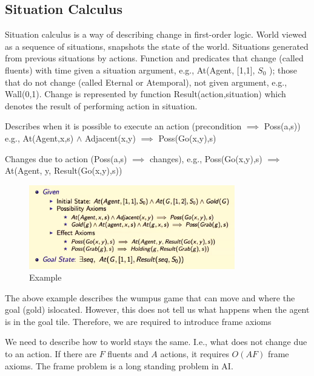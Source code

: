\documentclass[a4paper]{article}
\theoremstyle{plain}
\theoremstyle{definition}
\newtheorem{defn}{Definition}[section]
\theoremstyle{remark}
\begin{document}
\subsection{Situation Calculus}
Situation calculus is a way of describing change in first-order logic. World viewed as a sequence of situations, snapshots the state of the world. Situations generated from previous situations by actions. Function and predicates that change (called fluents) with time given a situation argument, e.g., At(Agent, [1,1], $S_0$ ); those that do not change (called Eternal or Atemporal), not given argument, e.g., Wall(0,1). Change is represented by function Result(action,situation) which denotes the result of performing action in situation.
\begin{tcolorbox}[colback=black!3!white,colframe=black!60!white,title=\begin{defn}Possibility Axioms \label{Possibility Axioms}\end{defn}]
Describes when it is possible to execute an action (precondition $\implies$ Poss(a,s)) e.g., At(Agent,x,s) $\land$ Adjacent(x,y) $\implies$ Poss(Go(x,y),s)
\end{tcolorbox}
\begin{tcolorbox}[colback=black!3!white,colframe=black!60!white,title=\begin{defn}Effect Axioms \label{Effect Axioms}\end{defn}]
Changes due to action (Poss(a,s) $\implies$ changes), e.g., Poss(Go(x,y),s) $\implies$ At(Agent, y, Result(Go(x,y),s))
\end{tcolorbox}
\begin{figure}[H]
	\centering
	\includegraphics[width=0.8\textwidth]{twelve.png}
	\caption{Example}
	\label{fig:twelve-png}
\end{figure}
The above example describes the wumpus game that can move and where the goal (gold) islocated. However, this does not tell us what happens when the agent is in the goal tile. Therefore, we are required to introduce frame axioms
\begin{tcolorbox}[colback=black!3!white,colframe=black!60!white,title=\begin{defn}Frame Axioms \label{Frame Axioms}\end{defn}]
We need to describe how to world stays the same. I.e., what does not change due to an action. If there are $F$ fluents and $A$ actions, it requires $O(AF)$ frame axioms. The frame problem is a long standing problem in AI.
\end{tcolorbox}
\end{document}
